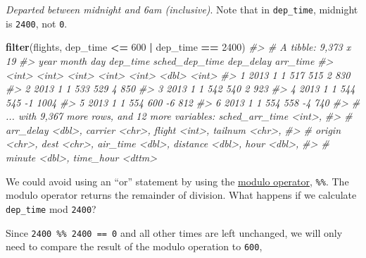 \documentclass[]{book}
\newenvironment{Shaded}{\begin{snugshade}}{\end{snugshade}}
\newcommand{\CommentTok}[1]{\textcolor[rgb]{0.56,0.35,0.01}{\textit{#1}}}
\newcommand{\DecValTok}[1]{\textcolor[rgb]{0.00,0.00,0.81}{#1}}
\newcommand{\KeywordTok}[1]{\textcolor[rgb]{0.13,0.29,0.53}{\textbf{#1}}}
\newcommand{\NormalTok}[1]{#1}
\newcommand{\OperatorTok}[1]{\textcolor[rgb]{0.81,0.36,0.00}{\textbf{#1}}}
\newcommand{\StringTok}[1]{\textcolor[rgb]{0.31,0.60,0.02}{#1}}
\theoremstyle{plain}
\theoremstyle{remark}
\theoremstyle{definition}
\theoremstyle{definition}
\theoremstyle{definition}
\theoremstyle{remark}
\begin{document}
\emph{Departed between midnight and 6am (inclusive)}. Note that in
\texttt{dep\_time}, midnight is \texttt{2400}, not \texttt{0}.

\begin{Shaded}
\begin{Highlighting}[]
\KeywordTok{filter}\NormalTok{(flights, dep_time }\OperatorTok{<=}\StringTok{ }\DecValTok{600} \OperatorTok{|}\StringTok{ }\NormalTok{dep_time }\OperatorTok{==}\StringTok{ }\DecValTok{2400}\NormalTok{)}
\CommentTok{#> # A tibble: 9,373 x 19}
\CommentTok{#>    year month   day dep_time sched_dep_time dep_delay arr_time}
\CommentTok{#>   <int> <int> <int>    <int>          <int>     <dbl>    <int>}
\CommentTok{#> 1  2013     1     1      517            515         2      830}
\CommentTok{#> 2  2013     1     1      533            529         4      850}
\CommentTok{#> 3  2013     1     1      542            540         2      923}
\CommentTok{#> 4  2013     1     1      544            545        -1     1004}
\CommentTok{#> 5  2013     1     1      554            600        -6      812}
\CommentTok{#> 6  2013     1     1      554            558        -4      740}
\CommentTok{#> # ... with 9,367 more rows, and 12 more variables: sched_arr_time <int>,}
\CommentTok{#> #   arr_delay <dbl>, carrier <chr>, flight <int>, tailnum <chr>,}
\CommentTok{#> #   origin <chr>, dest <chr>, air_time <dbl>, distance <dbl>, hour <dbl>,}
\CommentTok{#> #   minute <dbl>, time_hour <dttm>}
\end{Highlighting}
\end{Shaded}

We could avoid using an ``or'' statement by using the
\href{https://en.wikipedia.org/wiki/Modulo_operation}{modulo operator},
\texttt{\%\%}. The modulo operator returns the remainder of division.
What happens if we calculate \texttt{dep\_time} mod \texttt{2400}?

\begin{Shaded}
\end{Shaded}

Since \texttt{2400\ \%\%\ 2400\ ==\ 0} and all other times are left
unchanged, we will only need to compare the result of the modulo
operation to \texttt{600},
\end{document}
